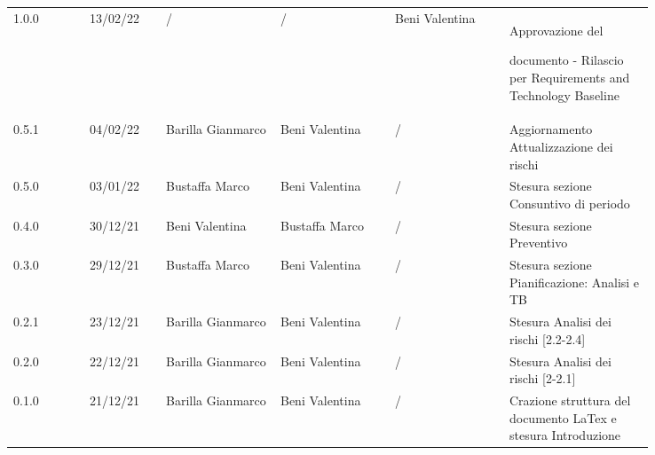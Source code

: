 {\begin{tabular}{p{0.10\linewidth}p{0.10\linewidth}p{0.15\linewidth}p{0.15\linewidth}p{0.15\linewidth}p{0.19\linewidth}}
	1.0.0 & 13/02/22 & / & / & Beni Valentina & Approvazione del \par documento - Rilascio per Requirements and Technology Baseline\\
	\rowcolor[RGB]{216, 235, 171}
	0.5.1 & 04/02/22 & Barilla Gianmarco& Beni Valentina & / & Aggiornamento Attualizzazione dei rischi\\
	\rowcolor[RGB]{233, 245, 206}
	0.5.0 & 03/01/22 & Bustaffa Marco& Beni Valentina & / & Stesura sezione Consuntivo di periodo\\
	\rowcolor[RGB]{216, 235, 171}
	0.4.0 & 30/12/21 & Beni Valentina& Bustaffa Marco & / & Stesura sezione Preventivo\\
	\rowcolor[RGB]{233, 245, 206}
	0.3.0 & 29/12/21 & Bustaffa Marco& Beni Valentina & / & Stesura sezione Pianificazione: Analisi e TB\\
	\rowcolor[RGB]{216, 235, 171}
	0.2.1 & 23/12/21 & Barilla Gianmarco& Beni Valentina & / & Stesura Analisi dei rischi [2.2-2.4]\\
	\rowcolor[RGB]{233, 245, 206}
	0.2.0 & 22/12/21 & Barilla Gianmarco & Beni Valentina & / & Stesura Analisi dei rischi [2-2.1]\\
	\rowcolor[RGB]{216, 235, 171}
	0.1.0 & 21/12/21 & Barilla Gianmarco & Beni Valentina & / & Crazione struttura del documento LaTex e stesura Introduzione\\	

\end{tabular}	
}

